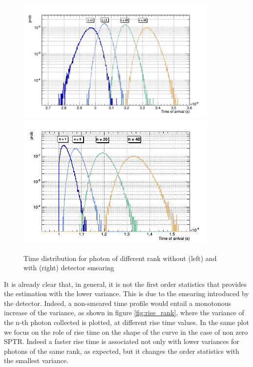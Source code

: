 \begin{figure}[htbp]
\begin{center}
\includegraphics[width=10cm]{../Pictures/Chapter_4/photon_rank.png}
\includegraphics[width=10cm]{../Pictures/Chapter_4/photon_rank_no_smear.png}
\end{center}
\caption[Photon rank RMS]{Time distribution for photon of different rank without (left) and with (right) detector smearing}
\label{fig:rank}
\end{figure}
It is already clear that, in general, it is not the first order statistics that provides the estimation with the lower variance. This is due to the smearing introduced by the detector. Indeed, a non-smeared time profile would entail a monotonous increase of the variance, as shown in figure \ref{fig:rise_rank}, where the variance of the n-th photon collected is plotted, at different rise time values.
In the same plot we focus on the role of rise time on the shape of the curve in the case of non zero SPTR. 
Indeed a faster rise time is associated not only with lower variances for photons of the same rank, as expected, but it changes the order statistics with the smallest variance.
